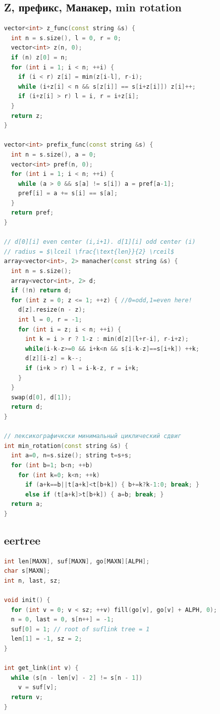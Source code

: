 \documentclass[8pt,a4paper,landscape,twosided]{extarticle}
\begin{document}
\begin{multicols*}{3}
\subsection{Z, префикс, Манакер, min rotation}
\begin{lstlisting}[language=C++]
vector<int> z_func(const string &s) {
  int n = s.size(), l = 0, r = 0;
  vector<int> z(n, 0);
  if (n) z[0] = n;
  for (int i = 1; i < n; ++i) {
    if (i < r) z[i] = min(z[i-l], r-i);
    while (i+z[i] < n && s[z[i]] == s[i+z[i]]) z[i]++;
    if (i+z[i] > r) l = i, r = i+z[i];
  }
  return z;
}

vector<int> prefix_func(const string &s) {
  int n = s.size(), a = 0;
  vector<int> pref(n, 0);
  for (int i = 1; i < n; ++i) {
    while (a > 0 && s[a] != s[i]) a = pref[a-1];
    pref[i] = a += s[i] == s[a];
  }
  return pref;
}

// d[0][i] even center (i,i+1). d[1][i] odd center (i)
// radius = $\lceil \frac{\text{len}}{2} \rceil$
array<vector<int>, 2> manacher(const string &s) {
  int n = s.size();
  array<vector<int>, 2> d;
  if (!n) return d;
  for (int z = 0; z <= 1; ++z) { //0=odd,1=even here!
    d[z].resize(n - z);
    int l = 0, r = -1;
    for (int i = z; i < n; ++i) {
      int k = i > r ? 1-z : min(d[z][l+r-i], r-i+z);
      while(i-k-z>=0 && i+k<n && s[i-k-z]==s[i+k]) ++k;
      d[z][i-z] = k--;
      if (i+k > r) l = i-k-z, r = i+k;
    }
  }
  swap(d[0], d[1]);
  return d;
}

// лексикографичкски минимальный циклический сдвиг
int min_rotation(const string &s) {
  int a=0, n=s.size(); string t=s+s;
  for (int b=1; b<n; ++b)
    for (int k=0; k<n; ++k)
      if (a+k==b||t[a+k]<t[b+k]) { b+=k?k-1:0; break; }
      else if (t[a+k]>t[b+k]) { a=b; break; }
  return a;
}

\end{lstlisting}

\subsection{eertree}
\begin{lstlisting}[language=C++]
int len[MAXN], suf[MAXN], go[MAXN][ALPH];
char s[MAXN];
int n, last, sz;

void init() {
  for (int v = 0; v < sz; ++v) fill(go[v], go[v] + ALPH, 0);
  n = 0, last = 0, s[n++] = -1;
  suf[0] = 1; // root of suflink tree = 1
  len[1] = -1, sz = 2;
}

int get_link(int v) {
  while (s[n - len[v] - 2] != s[n - 1])
    v = suf[v];
  return v;
}


\end{lstlisting}
\end{multicols*}
\end{document}
